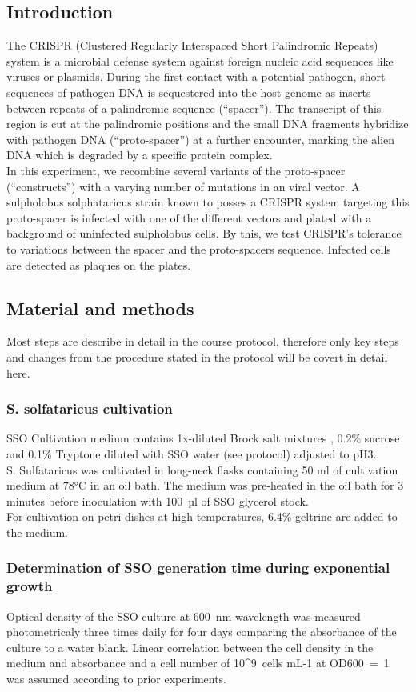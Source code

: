 \documentclass[a4paper,10pt]{article}
\begin{document}
\subsection{Introduction}
The CRISPR (Clustered Regularly Interspaced Short Palindromic Repeats) system is a microbial defense system against foreign nucleic acid sequences like viruses or plasmids. During the first contact with a potential pathogen, short sequences of pathogen DNA is sequestered into the host genome as inserts between repeats of a palindromic sequence (``spacer''). The transcript of this region is cut at the palindromic positions and the small DNA fragments hybridize with pathogen DNA (``proto-spacer'') at a further encounter, marking the alien DNA which is degraded by a specific protein complex. 
\\In this experiment, we recombine several variants of the proto-spacer (``constructs'') with a varying number of mutations in an viral vector. A sulpholobus solphataricus strain known to posses a CRISPR system targeting this proto-spacer is infected with one of the different vectors and plated with a background of uninfected sulpholobus cells. By this, we test CRISPR's tolerance to variations between the spacer and the proto-spacers sequence. Infected cells are detected as plaques on the plates.


\subsection{Material and methods}
Most steps are describe in detail in the course protocol, therefore only key steps and changes from the procedure stated in the protocol will be covert in detail here.

\subsubsection{S. solfataricus cultivation}
SSO Cultivation medium contains 1x-diluted Brock salt mixtures , 0.2\% sucrose and 0.1\% Tryptone diluted with SSO water (see protocol) adjusted to pH3.
\\S. Sulfataricus was cultivated in long-neck flasks containing 50 ml of cultivation medium at 78°C in an oil bath. The medium was pre-heated in the oil bath for 3 minutes before inoculation with 100 µl of SSO glycerol stock.
\\For cultivation on petri dishes at high temperatures, 6.4\% geltrine are added to the medium.

\subsubsection{Determination of SSO generation time during exponential growth}
Optical density of the SSO culture at 600 nm wavelength was measured photometricaly three times daily for four days comparing the absorbance of the culture to a water blank. Linear correlation between the cell density in the medium and absorbance and a cell number of 10^{9} cells mL-1 at OD600 = 1 was assumed according to prior experiments. 
\end{document}
